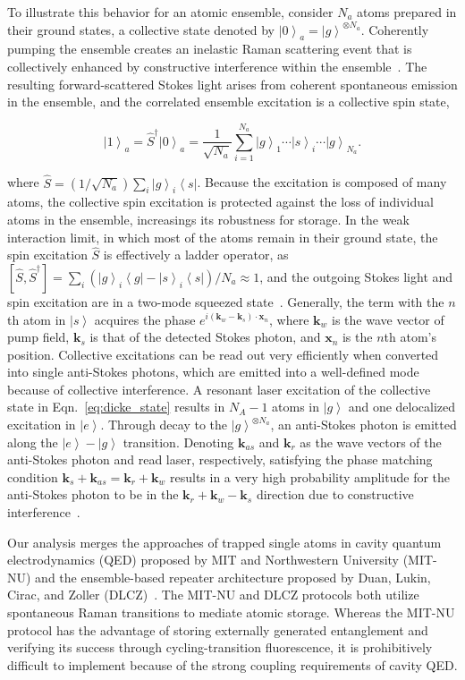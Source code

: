 \documentclass[aps,twocolumn,secnumarabic,amsmath,amssymb,pra,groupedaddress,
showpacs, showkeys,draft]{revtex4-1}
\newcommand{\bra}[1]{\left\langle #1 \right|}
\newcommand{\ket}[1]{\left|#1\right\rangle}
\newcommand{\pna}[1]{\left(#1\right)}
\newcommand{\eqn}[1]{
\begin{equation}
	#1
\end{equation}
}
\begin{document}
To illustrate this behavior for an atomic ensemble, consider $N_a$ atoms
prepared in their ground states, a collective state denoted by
$\ket{0}_a=\ket{g}^{\otimes N_a}$. Coherently pumping the ensemble creates an
inelastic Raman scattering event that is collectively enhanced by constructive
interference within the ensemble~\cite{PhysRev.93.99}. The resulting
forward-scattered Stokes light arises from coherent spontaneous emission in the
ensemble, and the correlated ensemble excitation is a collective spin state,
\eqn{
\ket{1}_a = \hat{S}^{\dagger}\ket{0}_a=\frac{1}{\sqrt{N_a}}\sum_{i=1}^{N_a}\ket{g}_1\cdots\ket{s}_i\cdots\ket{g}_{N_a}.
\label{eq:dicke_state}
}
where $\hat{S}=(1/\sqrt{N_a})\sum_i\ket{g}_i\bra{s}$. Because the excitation is
composed of many atoms, the collective spin excitation is protected against the
loss of individual atoms in the ensemble, increasings its robustness for
storage. In the weak interaction limit, in which most of the atoms remain in
their ground state, the spin excitation $\hat{S}$ is effectively a ladder
operator, as $[\hat{S},\hat{S}^{\dagger}] =
\sum_i\pna{\ket{g}_i\bra{g}-\ket{s}_i\bra{s}}/N_a\approx 1$, and the outgoing
Stokes light and spin excitation are in a two-mode squeezed
state~\cite{nature35106500}. Generally, the term with the $n$th atom in
$\ket{s}$ acquires the phase $e^{i\pna{\mathbf{k}_w-\mathbf{k}_s}\cdot
  \mathbf{x}_n}$, where $\mathbf{k}_w$ is the wave vector of pump field,
$\mathbf{k}_s$ is that of the detected Stokes photon, and $\mathbf{x}_n$ is the
$n$th atom's position.  Collective excitations can be read out very efficiently
when converted into single anti-Stokes photons, which are emitted into a
well-defined mode because of collective interference. A resonant laser
excitation of the collective state in Eqn.~\ref{eq:dicke_state} results in
$N_A-1$ atoms in $\ket{g}$ and one delocalized excitation in $\ket{e}$. Through
decay to the $\ket{g}^{\otimes N_a}$, an anti-Stokes photon is emitted along
the $\ket{e}-\ket{g}$ transition. Denoting $\mathbf{k}_{as}$ and $\mathbf{k}_r$
as the wave vectors of the anti-Stokes photon and read laser, respectively,
satisfying the phase matching condition
$\mathbf{k}_{s}+\mathbf{k}_{as}=\mathbf{k}_{r}+\mathbf{k}_{w}$ results in a
very high probability amplitude for the anti-Stokes photon to be in the
$\mathbf{k}_{r}+\mathbf{k}_{w}-\mathbf{k}_{s}$ direction due to constructive
interference~\cite{PhysRevLett.103.043601}. 

Our analysis merges the approaches of trapped single atoms in cavity quantum
electrodynamics (QED) proposed by MIT and Northwestern University (MIT-NU) and
the ensemble-based repeater architecture proposed by Duan, Lukin, Cirac, and
Zoller (DLCZ)~\cite{PhysRevLett.87.167903,nature35106500}. The MIT-NU and DLCZ
protocols both utilize spontaneous Raman transitions to mediate atomic
storage. Whereas the MIT-NU protocol has the advantage of storing externally
generated entanglement and verifying its success through cycling-transition
fluorescence, it is prohibitively difficult to implement because of the strong
coupling requirements of cavity QED. 
\end{document}
